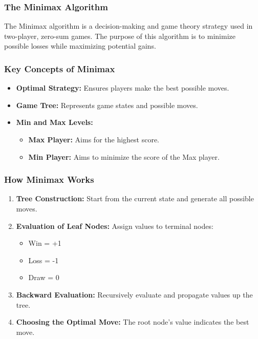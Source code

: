 \documentclass[aspectratio=169]{beamer}
\begin{document}
\begin{frame}[fragile]
    \frametitle{The Minimax Algorithm}
    The Minimax algorithm is a decision-making and game theory strategy used in two-player, zero-sum games. The purpose of this algorithm is to minimize possible losses while maximizing potential gains.
\end{frame}

\begin{frame}[fragile]
    \frametitle{Key Concepts of Minimax}
    \begin{itemize}
        \item \textbf{Optimal Strategy:} Ensures players make the best possible moves.
        \item \textbf{Game Tree:} Represents game states and possible moves.
        \item \textbf{Min and Max Levels:}
        \begin{itemize}
            \item \textbf{Max Player:} Aims for the highest score.
            \item \textbf{Min Player:} Aims to minimize the score of the Max player.
        \end{itemize}
    \end{itemize}
\end{frame}

\begin{frame}[fragile]
    \frametitle{How Minimax Works}
    \begin{enumerate}
        \item \textbf{Tree Construction:} Start from the current state and generate all possible moves.
        \item \textbf{Evaluation of Leaf Nodes:} Assign values to terminal nodes:
            \begin{itemize}
                \item Win = +1
                \item Loss = -1
                \item Draw = 0
            \end{itemize}
        \item \textbf{Backward Evaluation:} Recursively evaluate and propagate values up the tree.
        \item \textbf{Choosing the Optimal Move:} The root node's value indicates the best move.
    \end{enumerate}
\end{frame}
\end{document}
